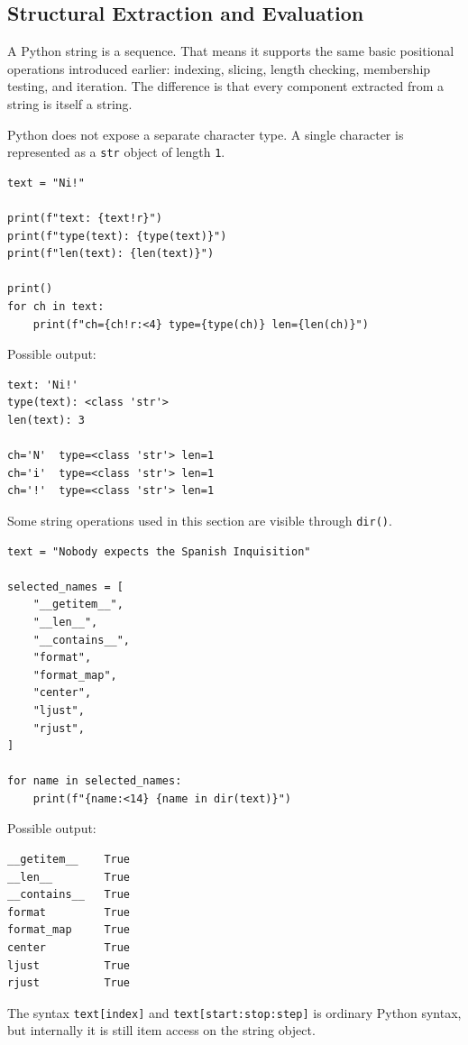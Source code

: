 \subsection{Structural Extraction and Evaluation}

A Python string is a sequence. That means it supports the same basic positional operations introduced earlier: indexing, slicing, length checking, membership testing, and iteration. The difference is that every component extracted from a string is itself a string.

Python does not expose a separate character type. A single character is represented as a \texttt{str} object of length \texttt{1}.

\begin{verbatim}
text = "Ni!"

print(f"text: {text!r}")
print(f"type(text): {type(text)}")
print(f"len(text): {len(text)}")

print()
for ch in text:
    print(f"ch={ch!r:<4} type={type(ch)} len={len(ch)}")
\end{verbatim}

Possible output:

\begin{verbatim}
text: 'Ni!'
type(text): <class 'str'>
len(text): 3

ch='N'  type=<class 'str'> len=1
ch='i'  type=<class 'str'> len=1
ch='!'  type=<class 'str'> len=1
\end{verbatim}

Some string operations used in this section are visible through \texttt{dir()}.

\begin{verbatim}
text = "Nobody expects the Spanish Inquisition"

selected_names = [
    "__getitem__",
    "__len__",
    "__contains__",
    "format",
    "format_map",
    "center",
    "ljust",
    "rjust",
]

for name in selected_names:
    print(f"{name:<14} {name in dir(text)}")
\end{verbatim}

Possible output:

\begin{verbatim}
__getitem__    True
__len__        True
__contains__   True
format         True
format_map     True
center         True
ljust          True
rjust          True
\end{verbatim}

The syntax \texttt{text[index]} and \texttt{text[start:stop:step]} is ordinary Python syntax, but internally it is still item access on the string object.

